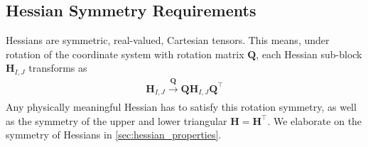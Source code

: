 \documentclass[pdflatex,sn-mathphys-num]{sn-jnl}%
\theoremstyle{thmstyleone}%
\theoremstyle{thmstyletwo}%
\theoremstyle{thmstylethree}%
\begin{document}
\subsection{Hessian Symmetry Requirements}
Hessians are symmetric, real-valued, Cartesian tensors. This means, under rotation of the coordinate system with rotation matrix $\mathbf{Q}$, each Hessian sub-block $\mathbf{H}_{I,J}$ transforms as 
\begin{align}
    \mathbf{H}_{I,J} \xrightarrow[]{\mathbf{Q}} \mathbf{Q} \mathbf{H}_{I,J} \mathbf{Q}^\top \label{eq:hessian_symmetry}
\end{align}
Any physically meaningful Hessian has to satisfy this rotation symmetry, as well as the symmetry of the upper and lower triangular $\mathbf{H}=\mathbf{H}^\top$. We elaborate on the symmetry of Hessians in \ref{sec:hessian_properties}.
\end{document}
